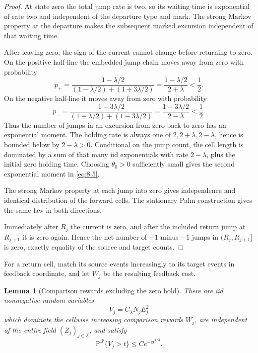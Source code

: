 \documentclass[11pt,reqno]{amsart}
\newtheorem{lemma}[theorem]{Lemma}
\theoremstyle{definition}
\theoremstyle{remark}
\numberwithin{equation}{section}
\newcommand{\Pp}{\mathbb P}
\begin{document}
\begin{proof}
At state zero the total jump rate is two, so its waiting time is
exponential of rate two and independent of the departure type and mark.
The strong Markov property at the departure makes the subsequent marked
excursion independent of that waiting time.

After leaving zero, the sign of the current cannot change before returning
to zero.  On the positive half-line the embedded jump chain moves away from
zero with probability
\[
p_+
=\frac{1-\lambda/2}{(1-\lambda/2)+(1+3\lambda/2)}
=\frac{1-\lambda/2}{2+\lambda}<\frac12.
\]
On the negative half-line it moves away from zero with probability
\[
p_-
=\frac{1-3\lambda/2}{(1+\lambda/2)+(1-3\lambda/2)}
=\frac{1-3\lambda/2}{2-\lambda}<\frac12.
\]
Thus the number of jumps in an excursion from zero back to zero has an exponential
moment.  The holding rate is always one of \(2,2+\lambda,2-\lambda\), hence is bounded
below by \(2-\lambda>0\).  Conditional on the jump count, the cell length is dominated
by a sum of that many iid exponentials with rate \(2-\lambda\), plus the initial zero
holding time.  Choosing \(\theta_0>0\) sufficiently small gives the second exponential
moment in \eqref{eq:8.5}.

The strong Markov property at each jump into zero gives independence and identical
distribution of the forward cells.  The stationary Palm construction gives the same
law in both directions.

Immediately after \(R_j\) the current is zero, and after the included return jump at
\(R_{j+1}\) it is zero again.  Hence the net number of \(+1\) minus \(-1\) jumps in
\((R_j,R_{j+1}]\) is zero, exactly equality of the source and target counts.
\end{proof}

For a return cell, match its source events increasingly to its target events
in feedback coordinate, and let \(W_j\) be the resulting feedback cost.

\begin{lemma}[Comparison rewards excluding the zero hold]
\label{lem:idle-free-reward}
There are iid nonnegative random variables
\[
V_j=C_\lambda N_jE_j^2
\]
which dominate the cellwise increasing comparison rewards \(W_j\),
are independent of the entire field \((Z_j)_{j\in\mathbb Z}\), and satisfy
\begin{equation}
\Pp^{\mathcal R}\{V_j>t\}\le Ce^{-ct^{1/3}}.
\label{eq:8.6}
\end{equation}
\end{lemma}
\end{document}
